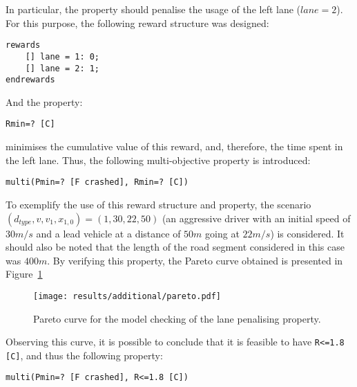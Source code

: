 In particular, the property should penalise the usage of the left lane ($lane = 2$). For this purpose, the following reward structure was designed:

\begin{minipage}{\linewidth}
{\vspace{1em}
\begin{lstlisting}
rewards
	[] lane = 1: 0;
	[] lane = 2: 1;
endrewards
\end{lstlisting}
}
\end{minipage}

And the property:

\begin{minipage}{\linewidth}
{\vspace{1em}
\begin{lstlisting}
Rmin=? [C]
\end{lstlisting}
}
\end{minipage}

minimises the cumulative value of this reward, and, therefore, the time spent in the left lane. Thus, the following multi-objective property is introduced:

\begin{minipage}{\linewidth}
{\vspace{1em}
\begin{lstlisting}
multi(Pmin=? [F crashed], Rmin=? [C])
\end{lstlisting}
}
\end{minipage}

To exemplify the use of this reward structure and property, the scenario $(d_{type}, v, v_1, x_{1,0}) = (1, 30, 22, 50)$ (an aggressive driver with an initial speed of $30m/s$ and a lead vehicle at a distance of $50m$ going at $22m/s$) is considered. It should also be noted that the length of the road segment considered in this case was $400m$. By verifying this property, the Pareto curve obtained is presented in Figure~\ref{fig:lane_penalising_pareto}

\begin{figure}[H]
\centering
\texttt{[image: results/additional/pareto.pdf]}
\caption{Pareto curve for the model checking of the lane penalising property.}
\label{fig:lane_penalising_pareto}
\end{figure}

Observing this curve, it is possible to conclude that it is feasible to have \texttt{R<=1.8 [C]}, and thus the following property:

\begin{minipage}{\linewidth}
{\vspace{1em}
\begin{lstlisting}
multi(Pmin=? [F crashed], R<=1.8 [C])
\end{lstlisting}
}
\end{minipage}

